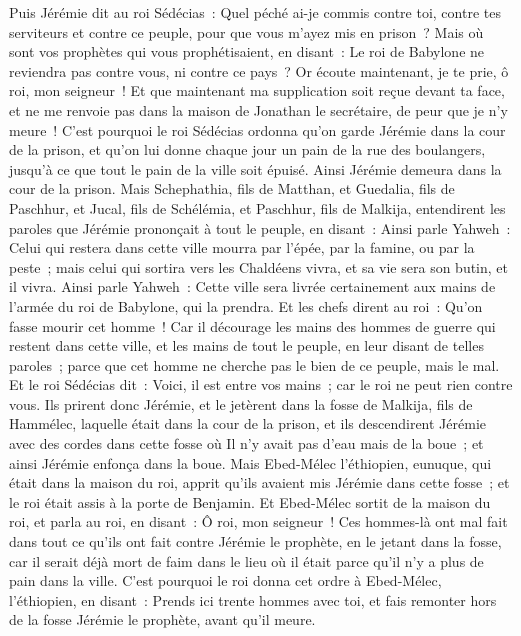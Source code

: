 \begin{multicols}{2}
Puis Jérémie dit au roi Sédécias~: Quel péché ai-je commis contre toi, contre tes serviteurs et contre ce peuple, pour que vous m'ayez mis en prison~?
Mais où sont vos prophètes qui vous prophétisaient, en disant~: Le roi de Babylone ne reviendra pas contre vous, ni contre ce pays~?
Or écoute maintenant, je te prie, ô roi, mon seigneur~! Et que maintenant ma supplication soit reçue devant ta face, et ne me renvoie pas dans la maison de Jonathan le secrétaire, de peur que je n'y meure~!
C'est pourquoi le roi Sédécias ordonna qu'on garde Jérémie dans la cour de la prison, et qu'on lui donne chaque jour un pain de la rue des boulangers, jusqu'à ce que tout le pain de la ville soit épuisé. Ainsi Jérémie demeura dans la cour de la prison.
\VerseOne{}Mais Schephathia, fils de Matthan, et Guedalia, fils de Paschhur, et Jucal, fils de Schélémia, et Paschhur, fils de Malkija, entendirent les paroles que Jérémie prononçait à tout le peuple, en disant~:
Ainsi parle Yahweh~: Celui qui restera dans cette ville mourra par l'épée, par la famine, ou par la peste~; mais celui qui sortira vers les Chaldéens vivra, et sa vie sera son butin, et il vivra.
Ainsi parle Yahweh~: Cette ville sera livrée certainement aux mains de l'armée du roi de Babylone, qui la prendra.
Et les chefs dirent au roi~: Qu'on fasse mourir cet homme~! Car il décourage les mains des hommes de guerre qui restent dans cette ville, et les mains de tout le peuple, en leur disant de telles paroles~; parce que cet homme ne cherche pas le bien de ce peuple, mais le mal.
Et le roi Sédécias dit~: Voici, il est entre vos mains~; car le roi ne peut rien contre vous.
Ils prirent donc Jérémie, et le jetèrent dans la fosse de Malkija, fils de Hammélec, laquelle était dans la cour de la prison, et ils descendirent Jérémie avec des cordes dans cette fosse où Il n'y avait pas d'eau mais de la boue~; et ainsi Jérémie enfonça dans la boue.
Mais Ebed-Mélec l'éthiopien, eunuque, qui était dans la maison du roi, apprit qu'ils avaient mis Jérémie dans cette fosse~; et le roi était assis à la porte de Benjamin.
Et Ebed-Mélec sortit de la maison du roi, et parla au roi, en disant~:
Ô roi, mon seigneur~! Ces hommes-là ont mal fait dans tout ce qu'ils ont fait contre Jérémie le prophète, en le jetant dans la fosse, car il serait déjà mort de faim dans le lieu où il était parce qu'il n'y a plus de pain dans la ville.
C'est pourquoi le roi donna cet ordre à Ebed-Mélec, l'éthiopien, en disant~: Prends ici trente hommes avec toi, et fais remonter hors de la fosse Jérémie le prophète, avant qu'il meure.

\end{multicols}
